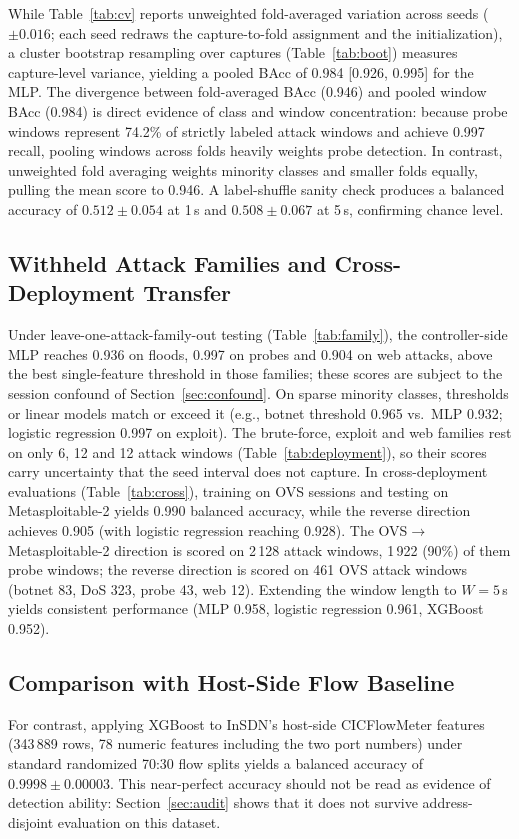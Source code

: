 \documentclass[journal]{IEEEtran}
\begin{document}
While Table~\ref{tab:cv} reports unweighted fold-averaged variation across seeds ($\pm0.016$; each seed redraws the capture-to-fold assignment and the initialization), a cluster bootstrap resampling over captures (Table~\ref{tab:boot}) measures capture-level variance, yielding a pooled BAcc of 0.984 [0.926, 0.995] for the MLP. The divergence between fold-averaged BAcc (0.946) and pooled window BAcc (0.984) is direct evidence of class and window concentration: because probe windows represent 74.2\% of strictly labeled attack windows and achieve 0.997 recall, pooling windows across folds heavily weights probe detection. In contrast, unweighted fold averaging weights minority classes and smaller folds equally, pulling the mean score to 0.946. A label-shuffle sanity check produces a balanced accuracy of $0.512\pm0.054$ at 1\,s and $0.508\pm0.067$ at 5\,s, confirming chance level.

\subsection{Withheld Attack Families and Cross-Deployment Transfer}
Under leave-one-attack-family-out testing (Table~\ref{tab:family}), the controller-side MLP reaches 0.936 on floods, 0.997 on probes and 0.904 on web attacks, above the best single-feature threshold in those families; these scores are subject to the session confound of Section~\ref{sec:confound}. On sparse minority classes, thresholds or linear models match or exceed it (e.g., botnet threshold 0.965 vs.\ MLP 0.932; logistic regression 0.997 on exploit). The brute-force, exploit and web families rest on only 6, 12 and 12 attack windows (Table~\ref{tab:deployment}), so their scores carry uncertainty that the seed interval does not capture. In cross-deployment evaluations (Table~\ref{tab:cross}), training on OVS sessions and testing on Metasploitable-2 yields 0.990 balanced accuracy, while the reverse direction achieves 0.905 (with logistic regression reaching 0.928). The OVS$\rightarrow$Metasploitable-2 direction is scored on 2\,128 attack windows, 1\,922 (90\%) of them probe windows; the reverse direction is scored on 461 OVS attack windows (botnet 83, DoS 323, probe 43, web 12). Extending the window length to $W{=}5$\,s yields consistent performance (MLP 0.958, logistic regression 0.961, XGBoost 0.952).

\subsection{Comparison with Host-Side Flow Baseline}
For contrast, applying XGBoost to InSDN's host-side CICFlowMeter features (343\,889 rows, 78 numeric features including the two port numbers) under standard randomized 70:30 flow splits yields a balanced accuracy of $0.9998\pm0.00003$. This near-perfect accuracy should not be read as evidence of detection ability: Section~\ref{sec:audit} shows that it does not survive address-disjoint evaluation on this dataset.
\end{document}
